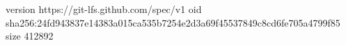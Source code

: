 version https://git-lfs.github.com/spec/v1
oid sha256:24fd943837e14383a015ca535b7254e2d3a69f45537849c8cd6fe705a4799f85
size 412892
